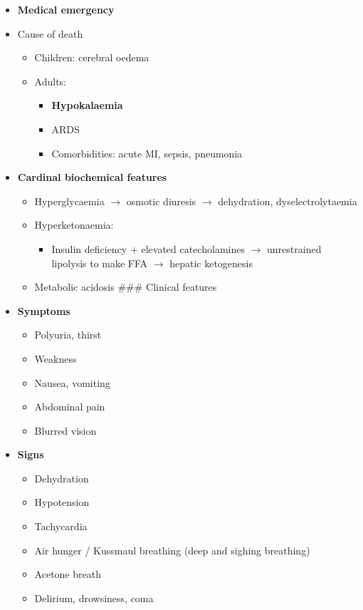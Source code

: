 \documentclass[
  12pt,
]{memoir}
\providecommand{\tightlist}{%
  \setlength{\itemsep}{0pt}\setlength{\parskip}{0pt}}
\begin{document}
\begin{itemize}
\tightlist
\item
  \textbf{Medical emergency}
\item
  Cause of death

  \begin{itemize}
  \tightlist
  \item
    Children: cerebral oedema
  \item
    Adults:

    \begin{itemize}
    \tightlist
    \item
      \textbf{Hypokalaemia}
    \item
      ARDS
    \item
      Comorbidities: acute MI, sepsis, pneumonia
    \end{itemize}
  \end{itemize}
\item
  \textbf{Cardinal biochemical features}

  \begin{itemize}
  \tightlist
  \item
    Hyperglycaemia \(\rightarrow\) osmotic diuresis \(\rightarrow\)
    dehydration, dyselectrolytaemia
  \item
    Hyperketonaemia:

    \begin{itemize}
    \tightlist
    \item
      Insulin deficiency + elevated catecholamines \(\rightarrow\)
      unrestrained lipolysis to make FFA \(\rightarrow\) hepatic
      ketogenesis
    \end{itemize}
  \item
    Metabolic acidosis \#\#\# Clinical features
  \end{itemize}
\item
  \textbf{Symptoms}

  \begin{itemize}
  \tightlist
  \item
    Polyuria, thirst
  \item
    Weakness
  \item
    Nausea, vomiting
  \item
    Abdominal pain
  \item
    Blurred vision
  \end{itemize}
\item
  \textbf{Signs}

  \begin{itemize}
  \tightlist
  \item
    Dehydration
  \item
    Hypotension
  \item
    Tachycardia
  \item
    Air hunger / Kussmaul breathing (deep and sighing breathing)
  \item
    Acetone breath
  \item
    Delirium, drowsiness, coma
  \end{itemize}
\end{itemize}
\end{document}
